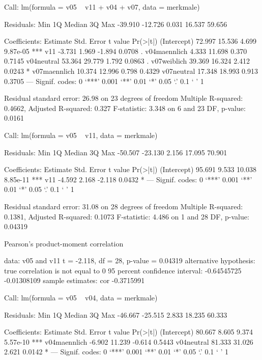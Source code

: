 \begin{Schunk}
\begin{Soutput}
Call:
lm(formula = v05 ~ v11 + v04 + v07, data = merkmale)

Residuals:
    Min      1Q  Median      3Q     Max 
-39.910 -12.726   0.031  16.537  59.656 

Coefficients:
             Estimate Std. Error t value Pr(>|t|)    
(Intercept)    72.997     15.536   4.699 9.87e-05 ***
v11            -3.731      1.969  -1.894   0.0708 .  
v04maennlich    4.333     11.698   0.370   0.7145    
v04neutral     53.364     29.779   1.792   0.0863 .  
v07weiblich    39.369     16.324   2.412   0.0243 *  
v07maennlich   10.374     12.996   0.798   0.4329    
v07neutral     17.348     18.993   0.913   0.3705    
---
Signif. codes:  0 ‘***’ 0.001 ‘**’ 0.01 ‘*’ 0.05 ‘.’ 0.1 ‘ ’ 1 

Residual standard error: 26.98 on 23 degrees of freedom
Multiple R-squared: 0.4662,	Adjusted R-squared: 0.327 
F-statistic: 3.348 on 6 and 23 DF,  p-value: 0.0161 
\end{Soutput}
\begin{Soutput}
Call:
lm(formula = v05 ~ v11, data = merkmale)

Residuals:
    Min      1Q  Median      3Q     Max 
-50.507 -23.130   2.156  17.095  70.901 

Coefficients:
            Estimate Std. Error t value Pr(>|t|)    
(Intercept)   95.691      9.533  10.038 8.85e-11 ***
v11           -4.592      2.168  -2.118   0.0432 *  
---
Signif. codes:  0 ‘***’ 0.001 ‘**’ 0.01 ‘*’ 0.05 ‘.’ 0.1 ‘ ’ 1 

Residual standard error: 31.08 on 28 degrees of freedom
Multiple R-squared: 0.1381,	Adjusted R-squared: 0.1073 
F-statistic: 4.486 on 1 and 28 DF,  p-value: 0.04319 
\end{Soutput}
\begin{Soutput}
	Pearson's product-moment correlation

data:  v05 and v11 
t = -2.118, df = 28, p-value = 0.04319
alternative hypothesis: true correlation is not equal to 0 
95 percent confidence interval:
 -0.64545725 -0.01308109 
sample estimates:
       cor 
-0.3715991 
\end{Soutput}
\begin{Soutput}
Call:
lm(formula = v05 ~ v04, data = merkmale)

Residuals:
    Min      1Q  Median      3Q     Max 
-46.667 -25.515   2.833  18.235  60.333 

Coefficients:
             Estimate Std. Error t value Pr(>|t|)    
(Intercept)    80.667      8.605   9.374 5.57e-10 ***
v04maennlich   -6.902     11.239  -0.614   0.5443    
v04neutral     81.333     31.026   2.621   0.0142 *  
---
Signif. codes:  0 ‘***’ 0.001 ‘**’ 0.01 ‘*’ 0.05 ‘.’ 0.1 ‘ ’ 1 


\end{Soutput}
\end{Schunk}

